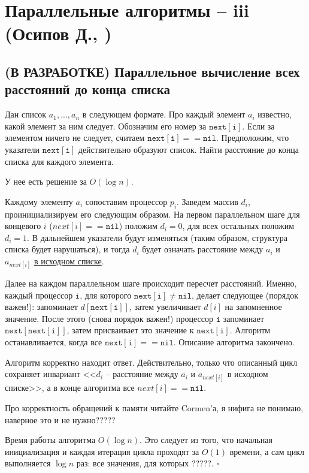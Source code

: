 \section{Параллельные алгоритмы -- iii (Осипов Д., \groth)}
\newcommand{\nxt}[1] {\mathtt{next[#1]}}
\newcommand{\nil} {\mathtt{nil}}
\subsection{(В РАЗРАБОТКЕ) Параллельное вычисление всех расстояний до конца списка}
\begin{problem}
Дан список $a_1, ..., a_n$  в следующем формате. Про каждый элемент $a_i$ известно, какой элемент за ним следует. Обозначим его номер за $\nxt{i}$. Если за элементом ничего не следует, считаем $\nxt{i} == \nil$. Предположим, что указатели $\nxt{i}$ действительно образуют список. Найти расстояние до конца списка для каждого элемента.
\end{problem}
У нее есть решение за $O(\log n)$.

Каждому элементу $a_i$ сопоставим процессор $p_i$. Заведем массив $d_i$, проинициализируем его следующим образом. На первом параллельном шаге для концевого $i$ ($next[i]==\nil$) положим $d_i = 0$, для всех остальных положим $d_i = 1$. В дальнейшем указатели будут изменяться (таким образом, структура списка будет нарушаться), и тогда $d_i$ будет означать расстояние между $a_i$ и $a_{next[i]}$ \underline{в исходном списке}.

Далее на каждом параллельном шаге происходит пересчет расстояний. Именно, каждый процессор $\mathtt i$, для которого $\nxt{i} \neq \nil$, делает следующее (порядок важен!): запоминает $d[\nxt{i}]$, затем увеличивает $d[i]$ на запомненное значение. После этого (снова порядок важен!) процессор $\mathtt i$ запоминает $\nxt{\nxt{i}}$, затем присваивает это значение к $\nxt{i}$. Алгоритм останавливается, когда все $\nxt{i} == \nil$. Описание алгоритма закончено.

Алгоритм корректно находит ответ. Действительно, только что описанный цикл сохраняет инвариант <<$d_i$ -- расстояние между $a_i$ и $a_{next[i]}$ в исходном списке>>, а в конце алгоритма все $next[i] == \nil$. 

Про корректность обращений к памяти читайте Cormen'а, я нифига не понимаю, наверное это и не нужно?????

Время работы алгоритма $O(\log n)$. Это следует из того, что начальная инициализация и каждая итерация цикла проходят за $O(1)$ времени, а сам цикл выполняется $\log n$ раз: все значения, для которых ?????. \hfill$\square$

